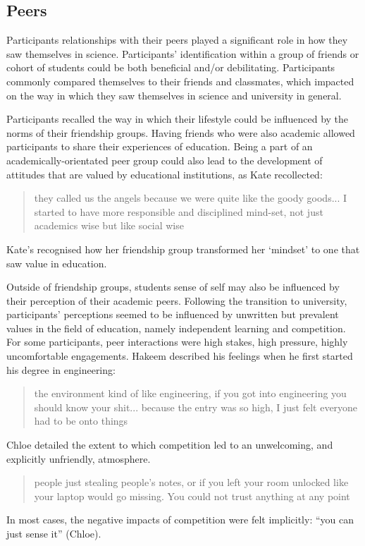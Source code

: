 \subsection{Peers}
Participants relationships with their peers played a significant role in how they saw themselves in science. Participants' identification within a group of friends or cohort of students could be both beneficial and/or debilitating. Participants commonly compared themselves to their friends and classmates, which impacted on the way in which they saw themselves in science and university in general.

Participants recalled the way in which their lifestyle could be influenced by the norms of their friendship groups. Having friends who were also academic allowed participants to share their experiences of education. Being a part of an academically-orientated peer group could also lead to the development of attitudes that are valued by educational institutions, as Kate recollected: \blockquote{they called us the angels because we were quite like the goody goods... I started to have more responsible and disciplined mind-set, not just academics wise but like social wise}. Kate's recognised how her friendship group transformed her `mindset' to one that saw value in education.  

Outside of friendship groups, students sense of self may also be influenced by their perception of their academic peers.  Following the transition to university, participants' perceptions seemed to be influenced by unwritten but prevalent values in the field of education, namely independent learning and competition. For some participants, peer interactions were  high stakes, high pressure, highly uncomfortable engagements. Hakeem described his feelings when he first started his degree in engineering: \blockquote{the environment kind of like engineering, if you got into engineering you should know your shit... because the entry was so high, I just felt everyone had to be onto things}. Chloe detailed the extent to which competition led to an unwelcoming, and explicitly unfriendly, atmosphere. \blockquote{people just stealing people’s notes, or if you left your room unlocked like your laptop would go missing. You could not trust anything at any point} In most cases, the negative impacts of competition were felt implicitly: ``you can just sense it'' (Chloe). 

